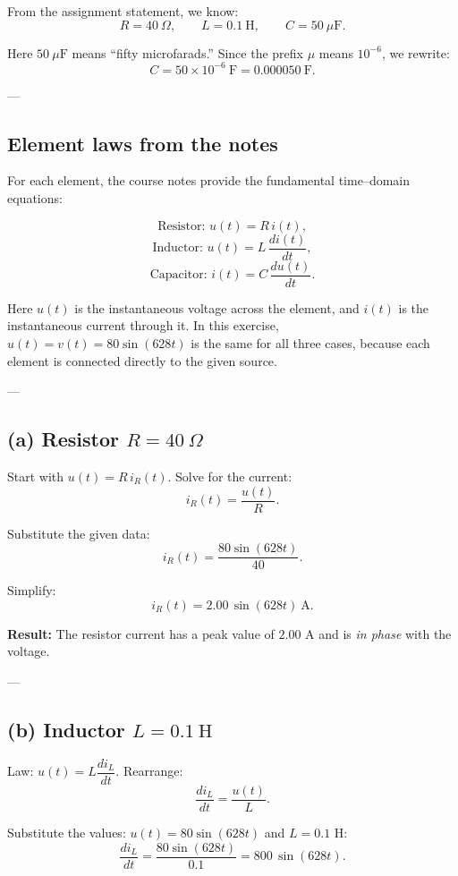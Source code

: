 \documentclass{article}
\begin{document}
From the assignment statement, we know:
\[
R = 40~\Omega, \qquad L = 0.1~\text{H}, \qquad C = 50~\mu\text{F}.
\]

Here $50~\mu\text{F}$ means “fifty microfarads.” Since the prefix $\mu$ means $10^{-6}$, we rewrite:
\[
C = 50 \times 10^{-6}\ \text{F} = 0.000050\ \text{F}.
\]

---

\subsection*{Element laws from the notes}

For each element, the course notes provide the fundamental time–domain equations:

\[
\text{Resistor: } u(t) = R \, i(t),
\]
\[
\text{Inductor: } u(t) = L \,\frac{di(t)}{dt},
\]
\[
\text{Capacitor: } i(t) = C \,\frac{du(t)}{dt}.
\]

Here $u(t)$ is the instantaneous voltage across the element, and $i(t)$ is the instantaneous current through it. In this exercise, $u(t)=v(t)=80\sin(628t)$ is the same for all three cases, because each element is connected directly to the given source.

---

\subsection*{(a) Resistor $R=40~\Omega$}

Start with $u(t) = R\,i_R(t)$.  
Solve for the current:
\[
i_R(t) = \frac{u(t)}{R}.
\]

Substitute the given data:  
\[
i_R(t) = \frac{80\sin(628t)}{40}.
\]

Simplify:
\[
i_R(t) = 2.00\,\sin(628t)\ \text{A}.
\]

\textbf{Result:} The resistor current has a peak value of $2.00$ A and is \emph{in phase} with the voltage.

---

\subsection*{(b) Inductor $L=0.1~\text{H}$}

Law: $u(t) = L \dfrac{di_L}{dt}$.  
Rearrange:
\[
\frac{di_L}{dt} = \frac{u(t)}{L}.
\]

Substitute the values: $u(t)=80\sin(628t)$ and $L=0.1$ H:
\[
\frac{di_L}{dt} = \frac{80\sin(628t)}{0.1} = 800\,\sin(628t).
\]
\end{document}
